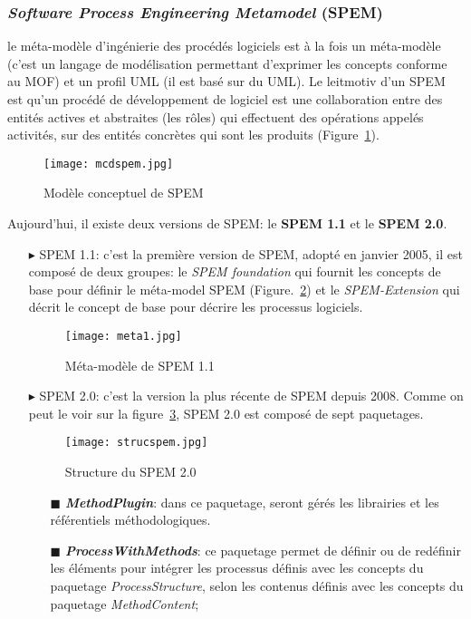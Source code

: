 \begin{itemize}
\subsubsection*{\textit{Software Process Engineering Metamodel} (SPEM)}\label{spemomglabel}
le méta-modèle d'ingénierie des procédés logiciels est à la fois un méta-modèle (c'est un langage de modélisation permettant d'exprimer les concepts conforme au MOF) et un profil UML (il est basé sur du UML). Le leitmotiv d'un SPEM est qu'un procédé de développement de logiciel est une collaboration entre des entités actives et abstraites (les rôles) qui effectuent des opérations appelés activités, sur des entités concrètes qui sont les produits (Figure~\ref{mcpomg}).\\
\begin{figure}[h]
\centering
\texttt{[image: mcdspem.jpg]}
\caption{\label{mcpomg}Modèle conceptuel de SPEM~\cite{omg1}}
\end{figure}
\clearpage
Aujourd'hui, il existe deux versions de SPEM: le \textbf{SPEM 1.1} et le \textbf{SPEM 2.0}.
\begin{itemize}
\item[\tiny{$\blacktriangleright$}] SPEM 1.1: c'est la première version de SPEM, adopté en janvier 2005, il est composé de deux groupes: le \textit{SPEM foundation} qui fournit les concepts de base pour définir le méta-model SPEM (Figure.~\ref{modele}) et le \textit{SPEM-Extension} qui décrit le concept de base pour décrire les processus logiciels. 
\begin{figure}[h] 
\centering
\texttt{[image: meta1.jpg]}
\caption{\label{modele}Méta-modèle de SPEM 1.1~\cite{omg1}}
\end{figure}
\item[\tiny{$\blacktriangleright$}] SPEM 2.0: c'est la version la plus récente de SPEM depuis 2008. Comme on peut le voir sur la figure~\ref{sspem}, SPEM 2.0 est composé de sept paquetages.
\clearpage
\begin{figure}[h]
\centering
\texttt{[image: strucspem.jpg]}
\caption{\label{sspem}Structure du SPEM 2.0~\cite{omg2}}
\end{figure}
\begin{itemize}
\item[\tiny{$\blacksquare$}] \textbf{ \textit{MethodPlugin}}: dans ce paquetage, seront gérés les librairies et les référentiels méthodologiques.
\item[\tiny{$\blacksquare$}] \textbf{ \textit{ProcessWithMethods}}: ce paquetage permet de définir ou de redéfinir les éléments pour intégrer les processus définis avec les concepts du paquetage \textit{ProcessStructure}, selon les contenus définis avec les concepts du paquetage \textit{MethodContent};

\end{itemize}
\end{itemize}
\end{itemize}
